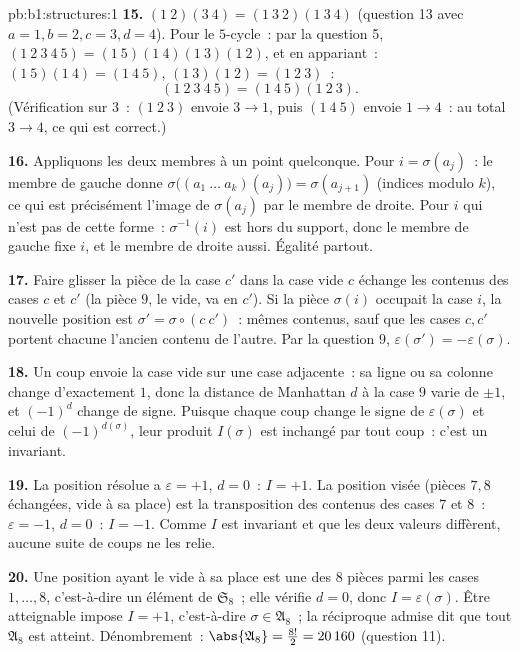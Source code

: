 \begin{solution}{pb:b1:structures:1}
\textbf{15.} $(1\ 2)(3\ 4) = (1\ 3\ 2)(1\ 3\ 4)$ (question 13
avec $a{=}1, b{=}2, c{=}3, d{=}4$). Pour le $5$-cycle~: par la
question 5, $(1\ 2\ 3\ 4\ 5) = (1\ 5)(1\ 4)(1\ 3)(1\ 2)$, et en
appariant~: $(1\ 5)(1\ 4) = (1\ 4\ 5)$, $(1\ 3)(1\ 2) = (1\ 2\ 3)$~:
\[
(1\ 2\ 3\ 4\ 5) = (1\ 4\ 5)(1\ 2\ 3) .
\]
(Vérification sur $3$~: $(1\ 2\ 3)$ envoie $3 \to 1$, puis
$(1\ 4\ 5)$ envoie $1 \to 4$~: au total $3 \to 4$, ce qui est correct.)

\textbf{16.} Appliquons les deux membres à un point quelconque. Pour
$i = \sigma(a_j)$~: le membre de gauche donne $\sigma\bigl((a_1\ \dots\
a_k)(a_j)\bigr) = \sigma(a_{j+1})$ (indices modulo $k$), ce qui est
précisément l'image de $\sigma(a_j)$ par le membre de droite. Pour $i$
qui n'est pas de cette forme~: $\sigma^{-1}(i)$ est hors du support,
donc le membre de gauche fixe $i$, et le membre de droite aussi.
Égalité partout.

\textbf{17.} Faire glisser la pièce de la case $c'$ dans la case vide
$c$ échange les contenus des cases $c$ et $c'$ (la pièce $9$, le
vide, va en $c'$). Si la pièce $\sigma(i)$ occupait la case $i$, la
nouvelle position est $\sigma' = \sigma \circ (c\ c')$~: mêmes
contenus, sauf que les cases $c, c'$ portent chacune l'ancien contenu
de l'autre. Par la question 9, $\varepsilon(\sigma') =
-\varepsilon(\sigma)$.

\textbf{18.} Un coup envoie la case vide sur une case adjacente~: sa
ligne ou sa colonne change d'exactement $1$, donc la distance de
Manhattan $d$ à la case $9$ varie de $\pm1$, et $(-1)^d$ change de
signe. Puisque chaque coup change le signe de $\varepsilon(\sigma)$ et
celui de $(-1)^{d(\sigma)}$, leur produit $I(\sigma)$ est inchangé par
tout coup~: c'est un invariant.

\textbf{19.} La position résolue a $\varepsilon = +1$, $d = 0$~:
$I = +1$. La position visée (pièces $7, 8$ échangées, vide à sa place)
est la transposition des contenus des cases $7$ et $8$~: $\varepsilon
= -1$, $d = 0$~: $I = -1$. Comme $I$ est invariant et que les deux
valeurs diffèrent, aucune suite de coups ne les relie.

\textbf{20.} Une position ayant le vide à sa place est une 
des $8$ pièces parmi les cases $1, \dots, 8$, c'est-à-dire un élément
de $\mathfrak S_8$~; elle vérifie $d = 0$, donc $I = \varepsilon(\sigma)$.
Être atteignable impose $I = +1$, c'est-à-dire $\sigma \in \mathfrak
A_8$~; la réciproque admise dit que tout $\mathfrak A_8$ est atteint.
Dénombrement~: $\abs{\mathfrak A_8} = \frac{8!}2 = 20\,160$
(question 11).


\end{solution}
